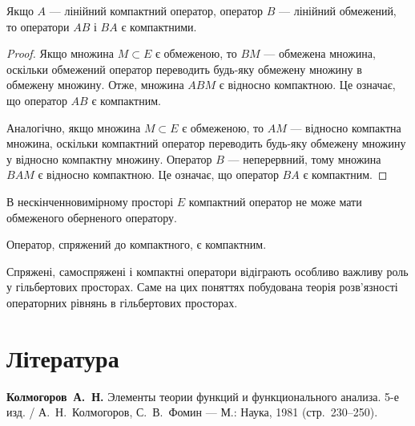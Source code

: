 \begin{theorem}
Якщо $A$ --- лінійний компактний
оператор, оператор $B$ --- лінійний обмежений, то
оператори $AB$ і $BA$ є компактними.
\end{theorem}

\begin{proof}
Якщо множина $M \subset E$ є обмеженою,
то $BM$ --- обмежена множина,
оскільки обмежений оператор
переводить будь-яку обмежену множину
в обмежену множину.
Отже, множина $ABM$ є відносно компактною.
Це означає, що оператор $AB$ є компактним.

Аналогічно, якщо множина $M \subset E$ є обмеженою,
то $AM$ --- відносно компактна множина,
оскільки компактний оператор
переводить будь-яку обмежену множину
у відносно компактну множину.
Оператор $B$ --- неперервний,
тому множина $BAM$ є відносно компактною.
Це означає, що оператор $BA$ є компактним. 
\end{proof}

\begin{corollary}
В нескінченновимірному просторі $E$
компактний оператор не може мати
обмеженого оберненого оператору.
\end{corollary}

\begin{theorem}
Оператор, спряжений до компактного, є компактним.
\end{theorem}

Спряжені, самоспряжені і компактні оператори
відіграють особливо важливу роль у гільбертових просторах.
Саме на цих поняттях побудована теорія
розв’язності операторних рівнянь в гільбертових просторах.

\section{Література}

\begin{enumerate}[label={[\arabic*]}]
\item \textbf{Колмогоров~А.~Н.}
Элементы теории функций и функционального анализа. 5-е изд. /
А.~Н.~Колмогоров, С.~В.~Фомин ---
М.: Наука, 1981 (стр.~230--250).
\end{enumerate}

